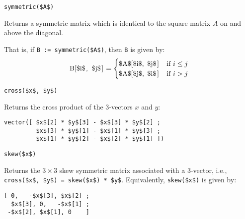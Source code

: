 \begin{functiondefinition}[symmetric]
\begin{synopsis}\begin{lstlisting}
symmetric($A$)
\end{lstlisting}\end{synopsis}
\begin{semantics}
Returns a symmetric matrix which is identical to the square matrix $A$ on and above the diagonal.

That is, if \lstinline!B := symmetric($A$)!, then \lstinline!B! is given by:
\begin{equation*}
\text{\lstinline!B[$i$, $j$]!} =
\begin{cases}
\text{\lstinline!$A$[$i$, $j$]!} & \text{if $i \leq j$}\\
\text{\lstinline!$A$[$j$, $i$]!} & \text{if $i > j$}
\end{cases}
\end{equation*}
\end{semantics}
\end{functiondefinition}

\begin{functiondefinition}[cross]
\begin{synopsis}\begin{lstlisting}
cross($x$, $y$)
\end{lstlisting}\end{synopsis}
\begin{semantics}
Returns the cross product of the 3-vectors $x$ and $y$:
\begin{lstlisting}[frame=none]
vector([ $x$[2] * $y$[3] - $x$[3] * $y$[2] ;
         $x$[3] * $y$[1] - $x$[1] * $y$[3] ;
         $x$[1] * $y$[2] - $x$[2] * $y$[1] ])
\end{lstlisting}
\end{semantics}
\end{functiondefinition}

\begin{functiondefinition}[skew]
\begin{synopsis}\begin{lstlisting}
skew($x$)
\end{lstlisting}\end{synopsis}
\begin{semantics}
Returns the $3 \times 3$ skew symmetric matrix associated with a 3-vector, i.e., \lstinline!cross($x$, $y$) = skew($x$) * $y$!.  Equivalently, \lstinline!skew($x$)! is given by:
\begin{lstlisting}[frame=none]
[ 0,   -$x$[3], $x$[2] ;
  $x$[3], 0,   -$x$[1] ;
 -$x$[2], $x$[1], 0    ]
\end{lstlisting}
\end{semantics}
\end{functiondefinition}

